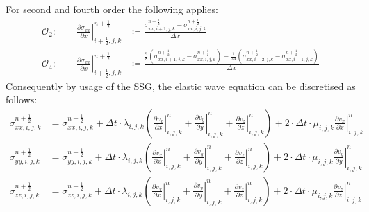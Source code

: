 \documentclass[pdftex,a4paper,parskip,listof=totoc,bibliography=totoc,onehalfspacing,12pt]{scrreprt}
\begin{document}
For second and fourth order the following applies: 
\begin{align}
	\mathcal{O}_2: \qquad   \left.\frac{\partial\sigma_{xx}}{\partial x}\right\rvert_{i+\frac{1}{2},j,k}^{n+\frac{1}{2}} &\overset{}{\coloneqq} \frac{\sigma_{xx,i+1,j,k}^{n+\frac{1}{2}} - \sigma_{xx,i,j,k}^{n+\frac{1}{2}}}{\Delta x}\label{eqn:FDO2O}\\
	\mathcal{O}_4: \qquad  \left.\frac{\partial\sigma_{xx}}{\partial x}\right\rvert_{i+\frac{1}{2},j,k}^{n+\frac{1}{2}} &\overset{}{\coloneqq} \frac{\frac{9}{8}\left(\sigma_{xx,i+1,j,k}^{n+\frac{1}{2}} - \sigma_{xx,i,j,k}^{n+\frac{1}{2}}\right) - \frac{1}{24}\left(\sigma_{xx,i+2,j,k}^{n+\frac{1}{2}} - \sigma_{xx,i-1,j,k}^{n+\frac{1}{2}}\right)}{\Delta x}
\end{align}
Consequently by usage of the SSG, the elastic wave equation can be discretised as follows:
\begin{align*}
	\sigma_{xx,i,j,k}^{n+\frac{1}{2}} &= \sigma_{xx,i,j,k}^{n-\frac{1}{2}} + \Delta t \cdot \lambda_{i,j,k} \left( \left.\frac{\partial v_x}{\partial x}\right\rvert_{i,j,k}^n + \left.\frac{\partial v_y}{\partial y}\right\rvert_{i,j,k}^n + \left.\frac{\partial v_z}{\partial z}\right\rvert_{i,j,k}^n \right) + 2 \cdot \Delta t  \cdot\mu_{i,j,k} \left.\frac{\partial v_x}{\partial x}\right\rvert_{i,j,k}^n\\
	\sigma_{yy,i,j,k}^{n+\frac{1}{2}} &= \sigma_{yy,i,j,k}^{n-\frac{1}{2}} + \Delta t \cdot \lambda_{i,j,k} \left( \left.\frac{\partial v_x}{\partial x}\right\rvert_{i,j,k}^n + \left.\frac{\partial v_y}{\partial y}\right\rvert_{i,j,k}^n + \left.\frac{\partial v_z}{\partial z}\right\rvert_{i,j,k}^n \right) + 2 \cdot \Delta t \cdot \mu_{i,j,k} \left.\frac{\partial v_y}{\partial y}\right\rvert_{i,j,k}^n\\
	\sigma_{zz,i,j,k}^{n+\frac{1}{2}} &= \sigma_{zz,i,j,k}^{n-\frac{1}{2}} + \Delta t \cdot \lambda_{i,j,k} \left( \left.\frac{\partial v_x}{\partial x}\right\rvert_{i,j,k}^n + \left.\frac{\partial v_y}{\partial y}\right\rvert_{i,j,k}^n + \left.\frac{\partial v_z}{\partial z}\right\rvert_{i,j,k}^n \right) + 2 \cdot \Delta t \cdot \mu_{i,j,k} \left.\frac{\partial v_z}{\partial z}\right\rvert_{i,j,k}^n
\end{align*}
\end{document}
